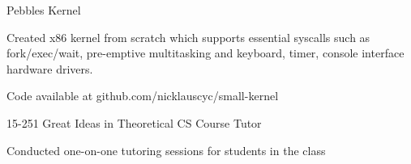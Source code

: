 
\vspace{-3.5mm}

\begin{cventries}

    \begin{multicols}{2}
  \cventry
    {} %
    {Pebbles Kernel} %
    {} %
    {} %
    {
      \begin{cvitems} %
        \item {Created x86 kernel from scratch which supports essential syscalls
          \newline such as fork/exec/wait, pre-emptive multitasking and keyboard,
          \newline timer,
          console interface hardware drivers.}
        \item {Code available at github.com/nicklauscyc/small-kernel}
      \end{cvitems}
    }


  \cventry
    {} %
{15-251 Great Ideas in Theoretical CS Course Tutor} %
    {}%
    {} %
    {
      \begin{cvitems} %
      \item {{Conducted one-on-one tutoring sessions for students in the class}}
      \end{cvitems}
    }




\end{multicols}
\end{cventries}
